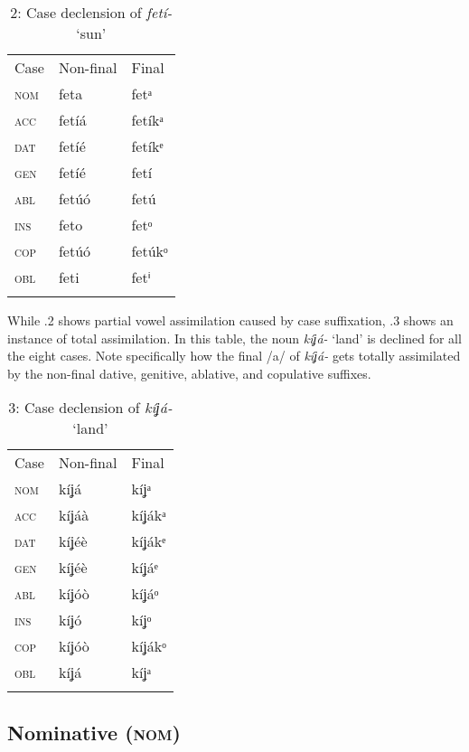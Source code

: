 \begin{table}
\caption{2: Case declension of \textit{fetí-} ‘sun’}
\label{tab:7}


\begin{tabularx}{\textwidth}{XXX}
\lsptoprule

Case & Non-final & Final\\
\textsc{nom} & feta & fetᵃ\\
\textsc{acc} & fetíá & fetíkᵃ\\
\textsc{dat} & fetíé & fetíkᵉ\\
\textsc{gen} & fetíé & fetí\\
\textsc{abl} & fetúó & fetú\\
\textsc{ins} & feto & fetᵒ\\
\textsc{cop} & fetúó & fetúkᵒ\\
\textsc{obl} & feti & fetⁱ\\
\lspbottomrule
\end{tabularx}
\end{table}
While .2 shows partial vowel assimilation caused by case suffixation, .3 shows an instance of total assimilation. In this table, the noun \textit{kíʝá-} ‘land’ is declined for all the eight cases. Note specifically how the final /a/ of \textit{kíʝá-} gets totally assimilated by the non-final dative, genitive, ablative, and copulative suffixes.


\begin{table}
\caption{3: Case declension of \textit{kíʝá-} ‘land’}
\label{tab:7}


\begin{tabularx}{\textwidth}{XXX}
\lsptoprule

Case & Non-final & Final\\
\textsc{nom} & kíʝá & kíʝᵃ\\
\textsc{acc} & kíʝáà & kíʝákᵃ\\
\textsc{dat} & kíʝéè & kíʝákᵉ\\
\textsc{gen} & kíʝéè & kíʝáᵉ\\
\textsc{abl} & kíʝóò & kíʝáᵒ\\
\textsc{ins} & kíʝó & kíʝᵒ\\
\textsc{cop} & kíʝóò & kíʝákᵒ\\
\textsc{obl} & kíʝá & kíʝᵃ\\
\lspbottomrule
\end{tabularx}
\end{table}




\subsection{Nominative (\textsc{nom})}


